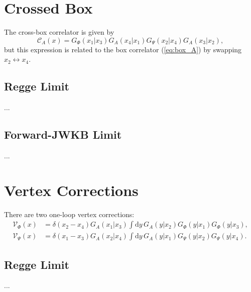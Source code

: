 \section{Crossed Box}
The cross-box correlator is given by
\begin{equation}
	\mathcal{C}_{A}(x) = G_{\Phi}(x_{1}| x_{3}) G_{A}(x_{4}| x_{1}) G_{\Psi}(x_{2}| x_{4}) G_{A}(x_{3}| x_{2}),
\end{equation}
but this expression is related to the box correlator (\ref{eq:box_A}) by swapping $x_{2} \longleftrightarrow x_{4}$.
\subsection{Regge Limit}
...
\subsection{Forward-JWKB Limit}
...
\section{Vertex Corrections}
There are two one-loop vertex corrections:
\begin{align}
	\mathcal{V}_{\Phi}(x) &= \delta(x_{2} - x_{4}) G_{A}(x_{1} | x_{3}) \int \mathrm{d}y \, G_{A}(y| x_{2}) G_{\Phi}(y| x_{1}) G_{\Phi}(y| x_{3}), \\
	\mathcal{V}_{\Psi}(x) &= \delta(x_{1} - x_{3}) G_{A}(x_{2} | x_{4}) \int \mathrm{d}y \, G_{A}(y| x_{1}) G_{\Psi}(y| x_{2}) G_{\Psi}(y| x_{4}).
\end{align}
\subsection{Regge Limit}
...
